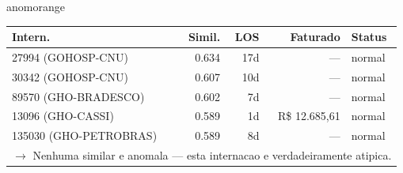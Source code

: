 \documentclass[a4paper,10pt]{article}
\begin{document}
\begin{anomalycard}[Internacao 77305 | PASA | ALTO (z=4.11)]{anomorange}
\begin{tabular}{l r r r l}\toprule\textbf{Intern.} & \textbf{Simil.} & \textbf{LOS} & \textbf{Faturado} & \textbf{Status} \\\midrule
27994 (GOHOSP-CNU) & 0.634 & 17d & --- & \textcolor{jcubeblue}{normal} \\
30342 (GOHOSP-CNU) & 0.607 & 10d & --- & \textcolor{jcubeblue}{normal} \\
89570 (GHO-BRADESCO) & 0.602 & 7d & --- & \textcolor{jcubeblue}{normal} \\
13096 (GHO-CASSI) & 0.589 & 1d & R\$ 12.685,61 & \textcolor{jcubeblue}{normal} \\
135030 (GHO-PETROBRAS) & 0.589 & 8d & --- & \textcolor{jcubeblue}{normal} \\
\multicolumn{5}{l}{\textcolor{jcubeblue}{\small $\rightarrow$ Nenhuma similar e anomala --- esta internacao e verdadeiramente atipica.}} \\
\bottomrule\end{tabular}



\end{anomalycard}

\newpage
\end{document}
